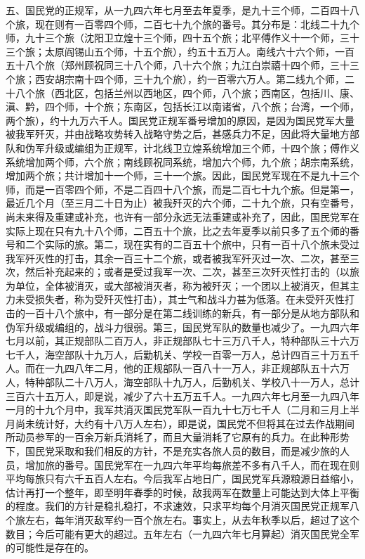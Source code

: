 五、国民党的正规军，从一九四六年七月至去年夏季，是九十三个师，二百四十八个旅，现在则有一百零四个师，二百七十九个旅的番号。其分布是：北线二十九个师，九十三个旅（沈阳卫立煌十三个师，四十五个旅；北平傅作义十一个师，三十三个旅；太原阎锡山五个师，十五个旅），约五十五万人。南线六十六个师，一百五十八个旅（郑州顾祝同三十八个师，八十六个旅；九江白崇禧十四个师，三十三个旅；西安胡宗南十四个师，三十九个旅），约一百零六万人。第二线九个师，二十八个旅（西北区，包括兰州以西地区，四个师，八个旅；西南区，包括川、康、滇、黔，四个师，十个旅；东南区，包括长江以南诸省，八个旅；台湾，一个师，两个旅），约十九万六千人。国民党正规军番号增加的原因，是因为国民党军大量被我军歼灭，并由战略攻势转入战略守势之后，甚感兵力不足，因此将大量地方部队和伪军升级或编组为正规军，计北线卫立煌系统增加三个师，十四个旅；傅作义系统增加两个师，六个旅；南线顾祝同系统，增加六个师，九个旅；胡宗南系统，增加两个旅；共计增加十一个师，三十一个旅。因此，国民党军现在不是九十三个师，而是一百零四个师，不是二百四十八个旅，而是二百七十九个旅。但是第一，最近几个月（至三月二十日为止）被我歼灭的六个师，二十九个旅，只有空番号，尚未来得及重建或补充，也许有一部分永远无法重建或补充了，因此，国民党军在实际上现在只有九十八个师，二百五十个旅，比之去年夏季以前只多了五个师的番号和二个实际的旅。第二，现在实有的二百五十个旅中，只有一百十八个旅未受过我军歼灭性的打击，其余一百三十二个旅，或者被我军歼灭过一次、二次，甚至三次，然后补充起来的；或者是受过我军一次、二次，甚至三次歼灭性打击的（以旅为单位，全体被消灭，或大部被消灭者，称为被歼灭；一个团以上被消灭，但其主力未受损失者，称为受歼灭性打击），其士气和战斗力甚为低落。在未受歼灭性打击的一百十八个旅中，有一部分是在第二线训练的新兵，有一部分是从地方部队和伪军升级或编组的，战斗力很弱。第三，国民党军队的数量也减少了。一九四六年七月以前，其正规部队二百万人，非正规部队七十三万八千人，特种部队三十六万七千人，海空部队十九万人，后勤机关、学校一百零一万人，总计四百三十万五千人。而在一九四八年二月，他的正规部队一百八十一万人，非正规部队五十六万人，特种部队二十八万人，海空部队十九万人，后勤机关、学校八十一万人，总计三百六十五万人，即是说，减少了六十五万五千人。一九四六年七月至一九四八年一月的十九个月中，我军共消灭国民党军队一百九十七万七千人（二月和三月上半月尚未统计好，大约有十八万人左右），即是说，国民党不但将其在过去作战期间所动员参军的一百余万新兵消耗了，而且大量消耗了它原有的兵力。在此种形势下，国民党采取和我们相反的方针，不是充实各旅人员的数目，而是减少旅的人员，增加旅的番号。国民党军在一九四六年平均每旅差不多有八千人，而在现在则平均每旅只有六千五百人左右。今后我军占地日广，国民党军兵源粮源日益缩小，估计再打一个整年，即至明年春季的时候，敌我两军在数量上可能达到大体上平衡的程度。我们的方针是稳扎稳打，不求速效，只求平均每个月消灭国民党正规军八个旅左右，每年消灭敌军约一百个旅左右。事实上，从去年秋季以后，超过了这个数目；今后可能有更大的超过。五年左右（一九四六年七月算起）消灭国民党全军的可能性是存在的。

